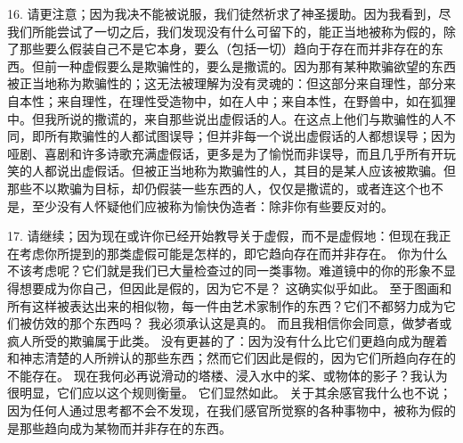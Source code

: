 16.  请更注意；因为我决不能被说服，我们徒然祈求了神圣援助。因为我看到，尽我们所能尝试了一切之后，我们发现没有什么可留下的，能正当地被称为假的，除了那些要么假装自己不是它本身，要么（包括一切）趋向于存在而并非存在的东西。但前一种虚假要么是欺骗性的，要么是撒谎的。因为那有某种欺骗欲望的东西被正当地称为欺骗性的；这无法被理解为没有灵魂的：但这部分来自理性，部分来自本性；来自理性，在理性受造物中，如在人中；来自本性，在野兽中，如在狐狸中。但我所说的撒谎的，来自那些说出虚假话的人。在这点上他们与欺骗性的人不同，即所有欺骗性的人都试图误导；但并非每一个说出虚假话的人都想误导；因为哑剧、喜剧和许多诗歌充满虚假话，更多是为了愉悦而非误导，而且几乎所有开玩笑的人都说出虚假话。但被正当地称为欺骗性的人，其目的是某人应该被欺骗。但那些不以欺骗为目标，却仍假装一些东西的人，仅仅是撒谎的，或者连这个也不是，至少没有人怀疑他们应被称为愉快伪造者：除非你有些要反对的。\par

17.  请继续；因为现在或许你已经开始教导关于虚假，而不是虚假地：但现在我正在考虑你所提到的那类虚假可能是怎样的，即它趋向存在而并非存在。 你为什么不该考虑呢？它们就是我们已大量检查过的同一类事物。难道镜中的你的形象不显得想要成为你自己，但因此是假的，因为它不是？ 这确实似乎如此。 至于图画和所有这样被表达出来的相似物，每一件由艺术家制作的东西？它们不都努力成为它们被仿效的那个东西吗？ 我必须承认这是真的。 而且我相信你会同意，做梦者或疯人所受的欺骗属于此类。 没有更甚的了：因为没有什么比它们更趋向成为醒着和神志清楚的人所辨认的那些东西；然而它们因此是假的，因为它们所趋向存在的不能存在。 现在我何必再说滑动的塔楼、浸入水中的桨、或物体的影子？我认为很明显，它们应以这个规则衡量。 它们显然如此。 关于其余感官我什么也不说；因为任何人通过思考都不会不发现，在我们感官所觉察的各种事物中，被称为假的是那些趋向成为某物而并非存在的东西。\par

